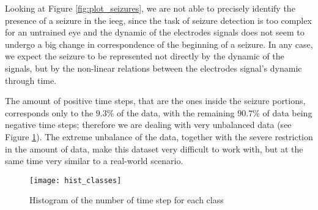\newpage

Looking at Figure \ref{fig:plot_seizures}, we are not able to precisely identify the presence of a seizure in the \acs{ieeg}, since the task of seizure detection is too complex for an untrained eye and the dynamic of the electrodes signals does not seem to undergo a big change in correspondence of the beginning of a seizure. In any case, we expect the seizure to be represented not directly by the dynamic of the signals, but by the non-linear relations between the electrodes signal's dynamic through time.

The amount of positive time steps, that are the ones inside the seizure portions, corresponds only to the $9.3$\% of the data, with the remaining $90.7$\% of data being negative time steps; therefore we are dealing with very unbalanced data (see Figure \ref{fig:hist_classes}). The extreme unbalance of the data, together with the severe restriction in the amount of data, make this dataset very difficult to work with, but at the same time very similar to a real-world scenario.
\begin{figure}[htbp]
    \centering
    \texttt{[image: hist\_classes]}
    \caption{Histogram of the number of time step for each class}
    \label{fig:hist_classes}
\end{figure}

